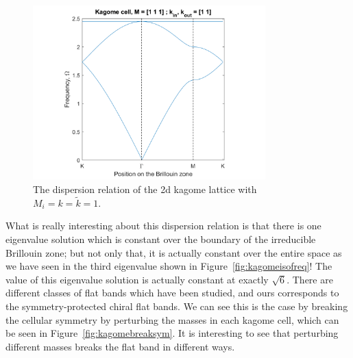 \begin{figure}[!h]
\centering
\includegraphics[width=0.8\textwidth]{imgs/kagomedisper.png}
\caption{\label{fig:kagomedisper} The dispersion relation of the 2d kagome
    lattice with $M_i=k=\tilde{k}=1$.}
\end{figure}

What is really interesting about this dispersion relation is that there is one
eigenvalue solution which is constant over the boundary of the irreducible
Brillouin zone; but not only that, it is actually constant over the entire
space as we have seen in the third eigenvalue shown in
Figure~\ref{fig:kagomeisofreq}! The value of this eigenvalue solution is
actually constant at exactly $\sqrt{6}$. There are different classes of flat
bands which have been studied,\cite{flatlines} and ours corresponds to the
symmetry-protected chiral flat bands. We can see this is the case by breaking
the cellular symmetry by perturbing the masses in each kagome cell, which can
be seen in Figure~\ref{fig:kagomebreaksym}. It is interesting to see that
perturbing different masses breaks the flat band in different ways.

